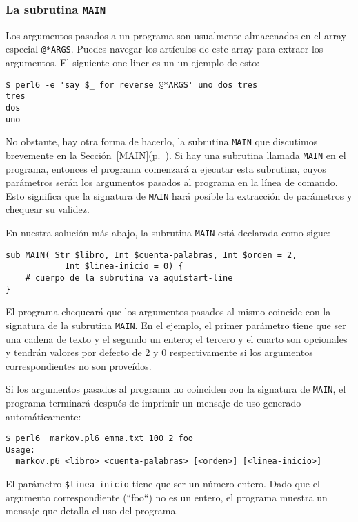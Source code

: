 \subsubsection{La subrutina {\tt MAIN}}
\label{MAIN_sub}

Los argumentos pasados a un programa son usualmente almacenados 
en el array especial \verb|@*ARGS|. Puedes navegar los artículos de este
array para extraer los argumentos. El siguiente one-liner es un 
un ejemplo de esto:

\begin{verbatim}
$ perl6 -e 'say $_ for reverse @*ARGS' uno dos tres
tres
dos
uno
\end{verbatim}

No obstante, hay otra forma de hacerlo, la subrutina {\tt MAIN}
que discutimos brevemente en la Sección~\ref{MAIN}(p.~\pageref{MAIN}).
Si hay una subrutina llamada {\tt MAIN} en el programa, entonces
el programa comenzará a ejecutar esta subrutina, cuyos parámetros
serán los argumentos pasados al programa en la línea de comando. Esto 
significa que la signatura de {\tt MAIN} hará posible la extracción de
parámetros y chequear su validez.

En nuestra solución más abajo, la subrutina {\tt MAIN} está declarada
como sigue:

\begin{verbatim}
sub MAIN( Str $libro, Int $cuenta-palabras, Int $orden = 2, 
            Int $linea-inicio = 0) {
    # cuerpo de la subrutina va aquístart-line
}
\end{verbatim}

El programa chequeará que los argumentos pasados al mismo 
coincide con la signatura de la subrutina {\tt MAIN}. En el ejemplo,
el primer parámetro tiene que ser una cadena de texto y el segundo
un entero; el tercero y el cuarto son opcionales y tendrán valores
por defecto de 2 y 0 respectivamente si los argumentos correspondientes
no son proveídos.

Si los argumentos pasados al programa no coinciden con la signatura
de {\tt MAIN}, el programa terminará después de imprimir un mensaje
de uso generado automáticamente:

\begin{verbatim}
$ perl6  markov.pl6 emma.txt 100 2 foo
Usage:
  markov.p6 <libro> <cuenta-palabras> [<orden>] [<linea-inicio>]
\end{verbatim}
El parámetro \verb|$linea-inicio| tiene que ser un número entero.
Dado que el argumento correspondiente (``foo``) no es un entero, 
el programa muestra un mensaje que detalla el uso del programa.

